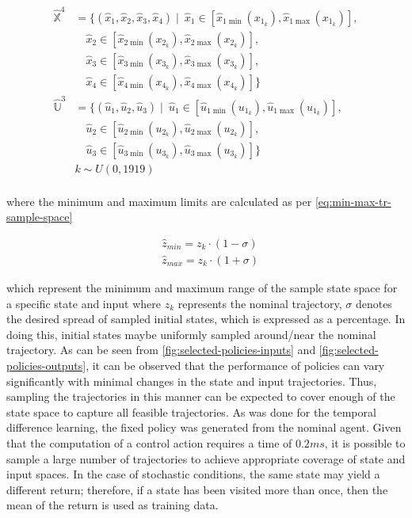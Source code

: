 \begin{equation}\label{eq:TR-sample-space}
	\begin{split}
		\hat{\mathbb{X}}^4 &= \{ (\hat{x}_1, \hat{x}_2, \hat{x}_3, \hat{x}_4) \mid\ \hat{x}_1 \in [\hat{x}_{1\min}(x_{1_k}), \hat{x}_{1\max}(x_{1_k})], \\
		&\quad \hat{x}_2 \in [\hat{x}_{2\min}(x_{2_k}), \hat{x}_{2\max}(x_{2_k})], \\
		&\quad \hat{x}_3 \in [\hat{x}_{3\min}(x_{3_k}), \hat{x}_{3\max}(x_{3_k})], \\
		&\quad \hat{x}_4 \in [\hat{x}_{4\min}(x_{4_k}), \hat{x}_{4\max}(x_{4_k})] \} \\
		\hat{\mathbb{U}}^3 &= \{ (\hat{u}_1, \hat{u}_2, \hat{u}_3) \mid\ \hat{u}_1 \in [\hat{u}_{1\min}(u_{1_k}), \hat{u}_{1\max}(u_{1_k})], \\
		&\quad \hat{u}_2 \in [\hat{u}_{2\min}(u_{2_k}), \hat{u}_{2\max}(u_{2_k})], \\
		&\quad \hat{u}_3 \in [\hat{u}_{3\min}(u_{3_k}), \hat{u}_{3\max}(u_{3_k})] \} \\
		& k \sim U(0,1919)  \\
	\end{split}
\end{equation}

where the minimum and maximum limits are calculated as per \autoref{eq:min-max-tr-sample-space}

\begin{equation}\label{eq:min-max-tr-sample-space}
	\begin{aligned}
		&\hat{z}_{min} = z_k \cdot (1-\sigma)\\
		&\hat{z}_{max} = z_k \cdot (1+\sigma)
	\end{aligned}
\end{equation}

which represent the minimum and maximum range of the sample state space for a specific state and input where ${z}_{k}$ represents the nominal trajectory, $\sigma$ denotes the desired spread of sampled initial states, which is expressed as a percentage. In doing this, initial states maybe uniformly sampled around/near the nominal trajectory. As can be seen from \autoref{fig:selected-policies-inputs} and \autoref{fig:selected-policies-outputs}, it can be observed that the performance of policies can vary significantly with minimal changes in the state and input trajectories. Thus, sampling the trajectories in this manner can be expected to cover enough of the state space to capture all feasible trajectories. As was done for the temporal difference learning, the fixed policy was generated from the nominal agent. Given that the computation of a control action requires a time of $0.2 ms$, it is possible to sample a large number of trajectories to achieve appropriate coverage of state and input spaces. In the case of stochastic conditions, the same state may yield a different return; therefore, if a state has been visited more than once, then the mean of the return is used as training data.

